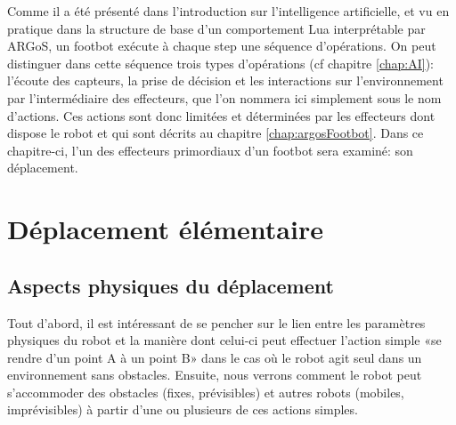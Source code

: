 Comme il a été présenté dans l'introduction sur l'intelligence artificielle, et vu en pratique dans la structure de base d'un comportement Lua interprétable par ARGoS, un footbot exécute à chaque step une séquence d'opérations. On peut distinguer dans cette séquence trois types d'opérations (cf chapitre \ref{chap:AI}): l'écoute des capteurs, la prise de décision et les interactions sur l'environnement par l'intermédiaire des effecteurs, que l'on nommera ici simplement sous le nom d'actions. Ces actions sont donc limitées et déterminées par les effecteurs dont dispose le robot et qui sont décrits au chapitre \ref{chap:argosFootbot}. Dans ce chapitre-ci, l'un des effecteurs primordiaux d'un footbot sera examiné: son déplacement.

\section{Déplacement élémentaire}

\subsection{Aspects physiques du déplacement}

Tout d'abord, il est intéressant de se pencher sur le lien entre les paramètres physiques du robot et la manière dont celui-ci peut effectuer l'action simple «se rendre d'un point A à un point B» dans le cas où le robot agit seul dans un environnement sans obstacles. Ensuite, nous verrons comment le robot peut s’accommoder des obstacles (fixes, prévisibles) et autres robots (mobiles, imprévisibles) à partir d'une ou plusieurs de ces actions simples.

